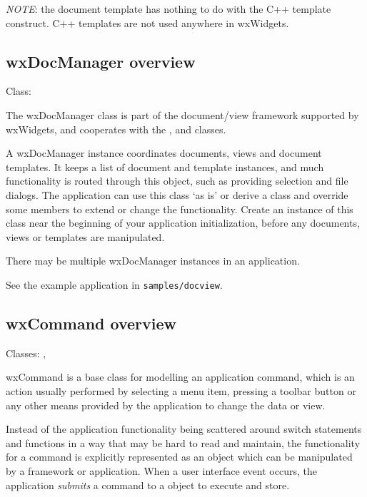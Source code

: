 {\it NOTE}: the document template has nothing to do with the C++ template construct. C++
templates are not used anywhere in wxWidgets.

\subsection{wxDocManager overview}\label{wxdocmanageroverview}


Class: 

The wxDocManager class is part of the document/view framework supported by wxWidgets,
and cooperates with the , \rtfsp
and  classes.

A wxDocManager instance coordinates documents, views and document templates. It keeps a list of document 
and template instances, and much functionality is routed through this object, such
as providing selection and file dialogs. The application can use this class `as is' or
derive a class and override some members to extend or change the functionality.
Create an instance of this class near the beginning of your application initialization,
before any documents, views or templates are manipulated.

There may be multiple wxDocManager instances in an application.

See the example application in {\tt samples/docview}.

\subsection{wxCommand overview}\label{wxcommandoverview}


Classes: , 

wxCommand is a base class for modelling an application command,
which is an action usually performed by selecting a menu item, pressing
a toolbar button or any other means provided by the application to
change the data or view.

Instead of the application functionality being scattered around
switch statements and functions in a way that may be hard to
read and maintain, the functionality for a command is explicitly represented
as an object which can be manipulated by a framework or application.
When a user interface event occurs, the application {\it submits} a command
to a  object to execute and
store.


